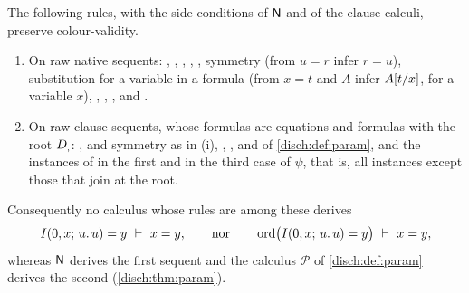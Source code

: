 \begin{theorem}
\label{comp:thm:rawvsub}
The following rules, with the side conditions of $\mathsf{N}$ and of the clause
calculi, preserve colour-validity.
\begin{enumerate}[label=(\roman*)]
\item On raw native sequents: , ,
 , , , symmetry (from $u=r$ infer
 $r=u$), substitution for a variable in a formula (from $x=t$ and $A$ infer
 $A[t/x]$, for a variable $x$), , ,
 ,  and .
\item On raw clause sequents, whose formulas are equations and formulas
 with the root $D_{,}$: ,  and symmetry as
 in (i), , ,  and
  of \cref{disch:def:param}, and the instances of
  in the first and in the third case of $\psi$, that is,
 all instances except those that join at the root.
\end{enumerate}
Consequently no calculus whose rules are among these derives
\[
 I(0,x;\,u.\,u)=y\ \vdash\ x=y,
 \qquad\text{nor}\qquad
 \operatorname{ord}\bigl(I(0,x;\,u.\,u)=y\bigr)\ \vdash\ x=y,
\]
whereas $\mathsf{N}$ derives the first sequent and the calculus $\mathcal P$ of
\cref{disch:def:param} derives the second (\cref{disch:thm:param}).
\end{theorem}

